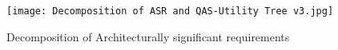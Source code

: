     
    \begin{figure}
        \graphicspath{ {./images/} }
        \texttt{[image: Decomposition of ASR and QAS-Utility Tree v3.jpg]}\\
        \caption{Decomposition of Architecturally significant requirements}
        \label{fig:ASR1}
    \end{figure}
